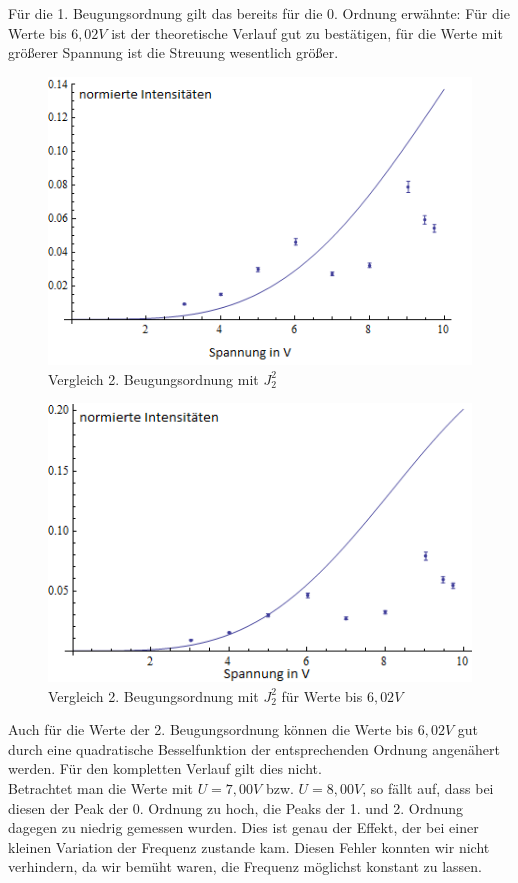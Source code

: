 Für die 1. Beugungsordnung gilt das bereits für die 0. Ordnung erwähnte: Für die Werte bis $6,02 V$ ist der theoretische Verlauf gut zu bestätigen, für die Werte mit größerer Spannung ist die Streuung wesentlich größer.\\
\begin{center}
\begin{figure}[htbp]
\includegraphics[scale=0.9]{Bilder/bessel2korr}
\caption{Vergleich 2. Beugungsordnung mit $J_{2}^{2}$}
\end{figure}
\end{center}
\begin{center}
\begin{figure}[htbp]
\includegraphics[scale=0.9]{Bilder/bessel21korr}
\caption{Vergleich 2. Beugungsordnung mit $J_{2}^{2}$ für Werte bis $6,02V$}
\end{figure}
\end{center}
Auch für die Werte der 2. Beugungsordnung können die Werte bis $6,02V$ gut durch eine quadratische Besselfunktion der entsprechenden Ordnung angenähert werden. Für den kompletten Verlauf gilt dies nicht. \\
Betrachtet man die Werte mit $U=7,00 V$ bzw. $U=8,00V$, so fällt auf, dass bei diesen der Peak der 0. Ordnung zu hoch, die Peaks der 1. und 2. Ordnung dagegen zu niedrig gemessen wurden. Dies ist genau der Effekt, der bei einer kleinen Variation der Frequenz zustande kam. Diesen Fehler konnten wir nicht verhindern, da wir bemüht waren, die Frequenz möglichst konstant zu lassen.\\
